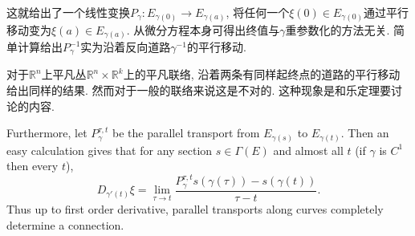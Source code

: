 这就给出了一个线性变换$P_{\gamma}:E_{\gamma(0)}\to E_{\gamma(a)}$, 将任何一个$\xi(0)\in E_{\gamma(0)}$通过平行移动变为$\xi(a)\in E_{\gamma(a)}$. 从微分方程本身可得出终值与$\gamma$重参数化的方法无关. 简单计算给出$P_\gamma^{-1}$实为沿着反向道路$\gamma^{-1}$的平行移动. 

对于$\mathbb{R}^n$上平凡丛$\mathbb{R}^n\times\mathbb{R}^k$上的平凡联络, 沿着两条有同样起终点的道路的平行移动给出同样的结果. 然而对于一般的联络来说这是不对的. 这种现象是和乐定理要讨论的内容.

Furthermore, let $P_\gamma^{\tau,t}$ be the parallel transport from $E_{\gamma(s)}$ to $E_{\gamma(t)}$. Then an easy calculation gives that for any section $s\in\Gamma(E)$ and almost all $t$ (if $\gamma$ is $C^1$ then every $t$),
$$D_{\gamma'(t)}\xi=\lim_{\tau\to t}\frac{P_\gamma^{\tau,t}s(\gamma(\tau))-s(\gamma(t))}{\tau-t}.$$
Thus up to first order derivative, parallel transports along curves completely determine a connection.
